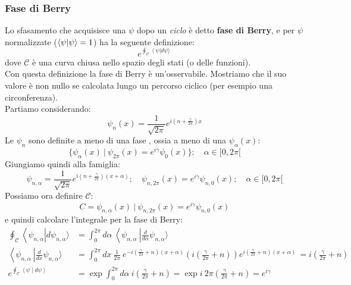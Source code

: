 \documentclass[../../FisicaTeorica.tex]{subfiles}
\begin{document}
\subsubsection{Fase di Berry}
Lo sfasamento che acquisisce una $\psi$ dopo un \textit{ciclo} è detto \textbf{fase di Berry}, e per $\psi$ normalizzate ($\braket{\psi|\psi} = 1$) ha la seguente definizione:
\[
e^{\oint_{\mathcal{C}}{\left\langle\psi\right|d\psi\rangle\ }}
\]
dove $\mathcal{C}$ è una curva chiusa nello spazio degli stati (o delle funzioni).\\
Con questa definizione la fase di Berry è un'osservabile. Mostriamo che il suo valore è non nullo se calcolata lungo un percorso ciclico (per esempio una circonferenza).\\
Partiamo considerando:
\[
\psi_n\left(x\right)=\frac{1}{\sqrt{2\pi}}e^{i\left(n+\frac{\gamma}{2\pi}\right)x}
\]
Le $\psi_n$ sono definite a meno di una fase , ossia a meno di una $\psi_\alpha(x)$:
\[
\{\psi_\alpha(x)\>|\>\psi_{2\pi}(x) = e^{i\gamma} \psi_0(x)\}; \quad \alpha \in [0,2\pi[
\]
Giungiamo quindi alla famiglia:
\[
\psi_{n,\alpha}=\frac{1}{\sqrt{2\pi}}e^{i\left(n+\frac{\gamma}{2\pi}\right)\left(x+\alpha\right)}; \quad \psi_{n,2\pi}(x) = e^{i\gamma}\psi_{n,0}(x); \quad \alpha \in [0,2\pi [
\]
Possiamo ora definire $\mathcal{C}$:
\[
C=\psi_{n,\alpha}\left(x\right)\>|\>  \psi_{n,2\pi}\left(x\right)=e^{i\gamma}\psi_{n,0}(x)
\]
e quindi calcolare l'integrale per la fase di Berry:
\begin{align*}
\oint_{\mathcal{C}}{\left\langle\psi_{n,\alpha}\right|d\psi_{n,\alpha}\rangle}&=\int_{0}^{2\pi}{d\alpha\ \left\langle\psi_{n,\alpha}\ \right|\frac{d}{d\alpha}\psi_{n,\alpha}\rangle\ }\\
\left\langle\psi_{n,\alpha}\ \right|\frac{d}{dx}\psi_{n,\alpha} \rangle &=\int_{0}^{2\pi}{dx\ \frac{1}{2\pi}\ e^{-i\left(\frac{\gamma}{2\pi}+n\right)\left(x+\alpha\right)}\left(i\left(\frac{\gamma}{2\pi}+n\right)\right)e^{i\left(\frac{\gamma}{2\pi}+n\right)\left(x+\alpha\right)\ }}=i\left(\frac{\gamma}{2\pi}+n\right)\\
e^{\oint_{\mathcal{C}}\left\langle\psi\middle| d\psi\right\rangle}&=\exp{\int_{0}^{2\pi}{d\alpha\ i\left(\frac{\gamma}{2\pi}+n\right)}}=\exp{i\ 2\pi\left(\frac{\gamma}{2\pi}+n\right)}=e^{i\gamma} 
\end{align*}
\end{document}
